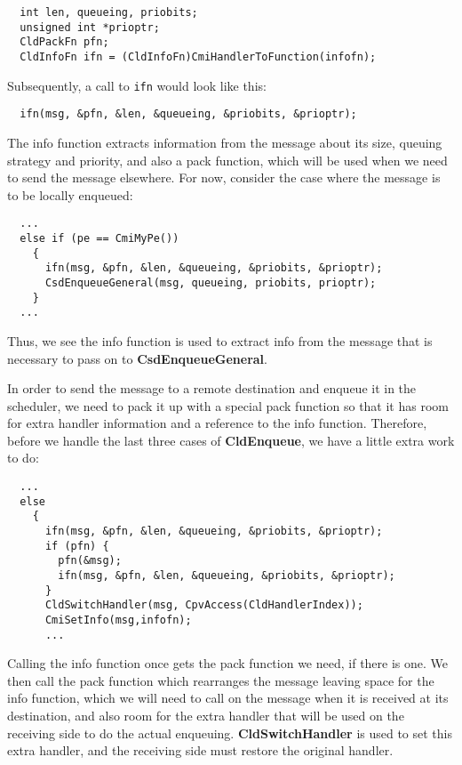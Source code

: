 \begin{verbatim}
  int len, queueing, priobits; 
  unsigned int *prioptr;
  CldPackFn pfn;
  CldInfoFn ifn = (CldInfoFn)CmiHandlerToFunction(infofn);
\end{verbatim}

\noindent Subsequently, a call to {\tt ifn} would look like this:

\begin{verbatim}
  ifn(msg, &pfn, &len, &queueing, &priobits, &prioptr);
\end{verbatim}

The info function extracts information from the message about its size,
queuing strategy and priority, and also a pack function, which will be
used when we need to send the message elsewhere.  For now, consider
the case where the message is to be locally enqueued:

\begin{verbatim}
  ...
  else if (pe == CmiMyPe())
    {
      ifn(msg, &pfn, &len, &queueing, &priobits, &prioptr);
      CsdEnqueueGeneral(msg, queueing, priobits, prioptr);
    }
  ...
\end{verbatim}

Thus, we see the info function is used to extract info from the
message that is necessary to pass on to {\bf CsdEnqueueGeneral}.

In order to send the message to a remote destination and enqueue it in
the scheduler, we need to pack it up with a special pack function so
that it has room for extra handler information and a reference to the
info function.  Therefore, before we handle the last three cases of
{\bf CldEnqueue}, we have a little extra work to do:

\begin{verbatim}
  ...
  else
    {
      ifn(msg, &pfn, &len, &queueing, &priobits, &prioptr);
      if (pfn) {
        pfn(&msg);
        ifn(msg, &pfn, &len, &queueing, &priobits, &prioptr);
      }
      CldSwitchHandler(msg, CpvAccess(CldHandlerIndex));
      CmiSetInfo(msg,infofn);
      ...
\end{verbatim}

Calling the info function once gets the pack function we need, if
there is one.  We then call the pack function which rearranges the
message leaving space for the info function, which we will need to
call on the message when it is received at its destination, and also
room for the extra handler that will be used on the receiving side to
do the actual enqueuing.  {\bf CldSwitchHandler} is used to set this extra
handler, and the receiving side must restore the original handler.

